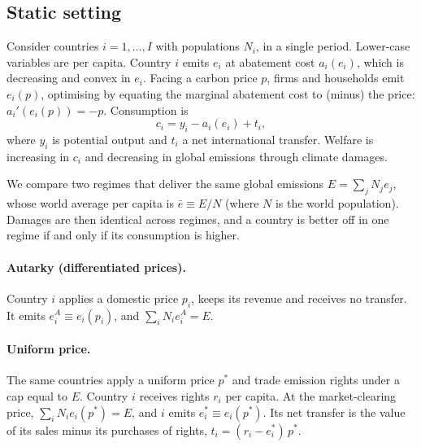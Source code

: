 \documentclass[12pt,english]{article}
\theoremstyle{remark}
\begin{document}
\subsection{Static setting}

Consider countries $i=1,\dots,I$ with populations $N_i$, %
in a single period. Lower-case variables are per capita. Country $i$ emits $e_i$ at abatement cost $a_i(e_i)$, which is decreasing and convex in $e_i$. Facing a carbon price $p$, firms and households emit $e_i(p)$, optimising by equating the marginal abatement cost to (minus) the price: $a_i'(e_i(p)) = -p$. Consumption is
\begin{equation}
  c_i = y_i - a_i(e_i) + t_i,
\end{equation}
where $y_i$ is potential output and $t_i$ a net international transfer. Welfare is increasing in $c_i$ and decreasing in global emissions through climate damages. 

We compare two regimes that deliver the same global emissions $E=\sum_j N_j e_j$, whose world average per capita is $\bar e\equiv E/N$ (where $N$ is the world population).
Damages are then identical across regimes, and a country is better off in one regime if and only if its consumption is higher.

\paragraph{Autarky (differentiated prices).} Country $i$ applies a domestic price $p_i$, keeps its revenue and receives no transfer. It emits $e^A_i \equiv e_i(p_i)$, and $\sum_i N_i e^A_i = E$.

\paragraph{Uniform price.} The same countries apply a uniform price $p^*$ and trade emission rights under a cap equal to $E$.
Country $i$ receives rights $r_i$ per capita. At the market-clearing price, $\sum_i N_i e_i(p^*) = E$,
and $i$ emits $e^*_i \equiv e_i(p^*)$. Its net transfer is the value of its sales minus its purchases of rights, $t_i=(r_i-e^*_i)\,p^*$.
\end{document}
